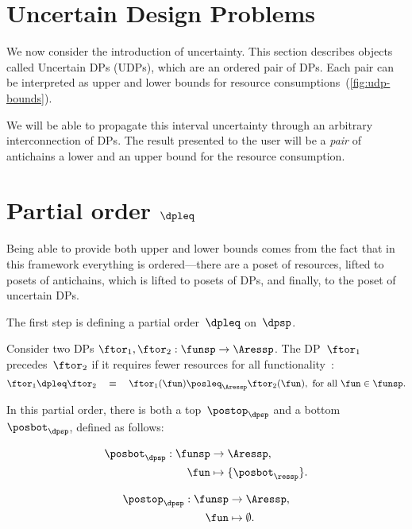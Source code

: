 \section{Uncertain Design Problems}
\label{sec:UDP}

We now consider the introduction of uncertainty.
This section describes
objects called Uncertain DPs (UDPs), which are an ordered pair of
DPs.
Each pair can be interpreted as upper and lower bounds for resource
consumptions~(\cref{fig:udp-bounds}).


We will be able to propagate this interval uncertainty through an
arbitrary interconnection of DPs.
The result presented to the user
will be a \emph{pair} of antichains \textemdash{} a lower and an upper
bound for the resource consumption.


\section{Partial order $\dpleq$}

Being able to provide both upper and lower bounds comes from the fact
that in this framework everything is ordered---there are
a poset of resources, lifted to posets of antichains, which is lifted
to posets of DPs, and finally, to the poset of uncertain DPs.

The first step is defining a partial order~$\dpleq$ on~$\dpsp$.
\begin{definition}
    Consider two DPs $\ftor_{1},\ftor_{2}:\funsp\rightarrow\Aressp$.
    The DP~$\ftor_{1}$ precedes~$\ftor_{2}$ if it requires fewer resources
    for all functionality~\fun:
    \[
        \ftor_{1}\dpleq\ftor_{2}\quad\equiv\quad\ftor_{1}(\fun)\posleq_{\Aressp}\ftor_{2}(\fun),\ \text{for all }\fun\in\funsp.
    \]
\end{definition}

In this partial order, there is both a top~$\postop_{\dpsp}$ and a
bottom~$\posbot_{\dpsp}$, defined as follows:

\vspace{-5mm}

\begin{minipage}[t]{0.4\columnwidth}
    \begin{align*}
        \posbot_{\dpsp}:\funsp & \rightarrow\Aressp,\\
        \fun & \mapsto\{\posbot_{\ressp}\}.
    \end{align*}

\end{minipage}
\begin{minipage}[t]{0.4\columnwidth}
    \begin{align}
        \postop_{\dpsp}:\funsp & \rightarrow\Aressp,\nonumber \\
        \fun & \mapsto\emptyset.\label{eq:top}
    \end{align}

\end{minipage}

